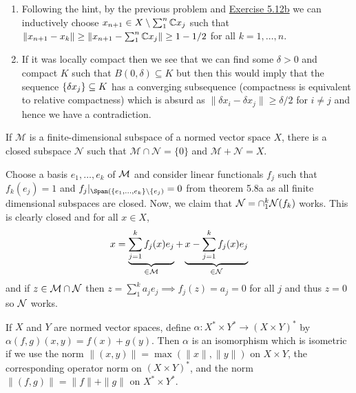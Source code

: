 \documentclass[12pt,a4paper]{article}
\begin{document}
\begin{solution}
\begin{enumerate}[label=\alph*.]
    \item Following the hint, by the previous problem and \hyperref[prob:5-12]{Exercise 5.12b} we can inductively choose $x_{n+1}\in X\setminus\sum_1^n\mathbb{C} x_j$ such that $\|x_{n+1}-x_k\|\geq\|x_{n+1}-\sum_1^n\mathbb{C} x_j\|\geq 1-1/2$ for all $k=1,\ldots,n$. 
    \item If it was locally compact then we see that we can find some $\delta>0$ and compact $K$ such that $B(0,\delta) \subseteq K$ but then this would imply that the sequence $ \qty{\delta x_j} \subseteq K$ has a converging subsequence (compactness is equivalent to relative compactness) which is absurd as $\|\delta x_i-\delta x_j\|\geq\delta/2$ for $i\neq j$ and hence we have  a contradiction. 
\end{enumerate}
\end{solution}
\begin{problem}\label{prob:5-20}
If $\mathcal{M}$ is a finite-dimensional subspace of a normed vector space $X$, there is a closed subspace $\mathcal{N}$ such that $\mathcal{M} \cap \mathcal{N} = \{0\}$ and $\mathcal{M} + \mathcal{N} = X$.
\end{problem}
\begin{solution}
    Choose a basis $e_1,\ldots,e_k$ of $\mathcal{M}$ and consider linear functionals $f_j$ such that $f_k(e_j)=1$ and $f_j|_{\Span (\{e_1,\ldots,e_k\}\setminus\{e_j)}=0$ from theorem 5.8a as all finite dimensional subspaces are closed. 
    Now, we claim that $\mathcal{N}=\cap_1^k\mathcal{N}(f_k)$ works. 
    This is clearly closed and for all $x\in X$, 
    \[
        x=\underbrace{\sum_{j=1}^kf_j(x)e_j}_{\in\mathcal{M}}+\underbrace{x-\sum_{j=1}^kf_j(x)e_j}_{\in\mathcal{N}}
    \]
    and if $z\in\mathcal{M}\cap\mathcal{N}$ then $z=\sum_1^ka_je_j\implies f_j(z)=a_j=0$ for all $j$ and thus $z=0$ so $\mathcal{N}$ works. 
\end{solution}
\begin{problem}\label{prob:5-21}
If $X$ and $Y$ are normed vector spaces, define $\alpha : X^* \times Y^* \rightarrow (X \times Y)^*$ by $\alpha(f,g)(x,y) = f(x) + g(y)$. Then $\alpha$ is an isomorphism which is isometric if we use the norm $\|(x,y)\| = \max(\|x\|, \|y\|)$ on $X \times Y$, the corresponding operator norm on $(X \times Y)^*$, and the norm $\|(f,g)\| = \|f\| + \|g\|$ on $X^* \times Y^*$.
\end{problem}
\end{document}
